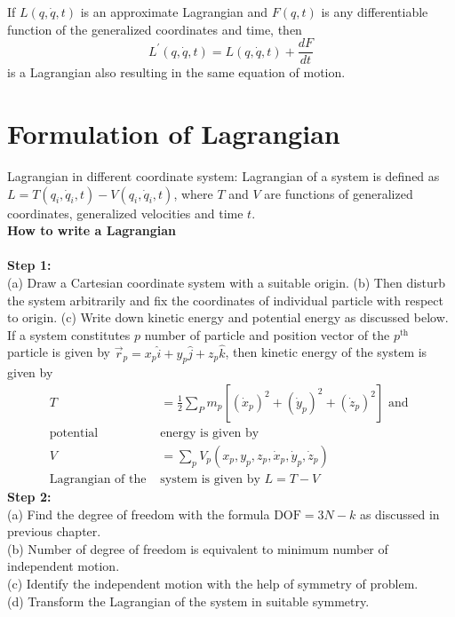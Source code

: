 \begin{note}
	If $L(q,\dot{q},t)$ is an approximate Lagrangian and $F(q,t)$ is any differentiable function of the generalized coordinates and time, then
	$$L^{\prime}(q, \dot{q}, t)=L(q, \dot{q}, t)+\frac{d F}{d t}$$
	is a Lagrangian also resulting in the same equation of motion.
\end{note}
\section{Formulation of Lagrangian}
Lagrangian in different coordinate system:
Lagrangian of a system is defined as $L=T\left(q_{i}, \dot{q}_{i}, t\right)-V\left(q_{i}, \dot{q}_{i}, t\right)$, where $T$ and $V$ are functions of generalized coordinates, generalized velocities and time $t$.\\
\textbf{How to write a Lagrangian}\\\\
\textbf{Step 1:}\\
(a) Draw a Cartesian coordinate system with a suitable origin.
(b) Then disturb the system arbitrarily and fix the coordinates of individual particle with respect to origin.
(c) Write down kinetic energy and potential energy as discussed below.
If a system constitutes $p$ number of particle and position vector of the $p^{\text {th }}$ particle is given by $\vec{r}_{p}=x_{p} \hat{i}+y_{p} \hat{j}+z_{p} \hat{k}$, then kinetic energy of the system is given by
\begin{align*}
T&=\frac{1}{2} \sum_{P} m_{p}\left[\left(\dot{x}_{p}\right)^{2}+\left(\dot{y}_{p}\right)^{2}+\left(\dot{z}_{p}\right)^{2}\right] \text { and }\\
\text{potential }&\text{energy is given by}\\
V&=\sum_{p} V_{p}\left(x_{p}, y_{p}, z_{p}, \dot{x}_{p}, \dot{y}_{p}, \dot{z}_{p}\right)\\
\text{Lagrangian of the  }&\text{system is given by }L=T-V
\end{align*}
\textbf{Step 2:}\\
(a) Find the degree of freedom with the formula $\mathrm{DOF}=3 N-k$ as discussed in previous chapter.\\
(b) Number of degree of freedom is equivalent to minimum number of independent motion.\\
(c) Identify the independent motion with the help of symmetry of problem.\\
(d) Transform the Lagrangian of the system in suitable symmetry.\\
